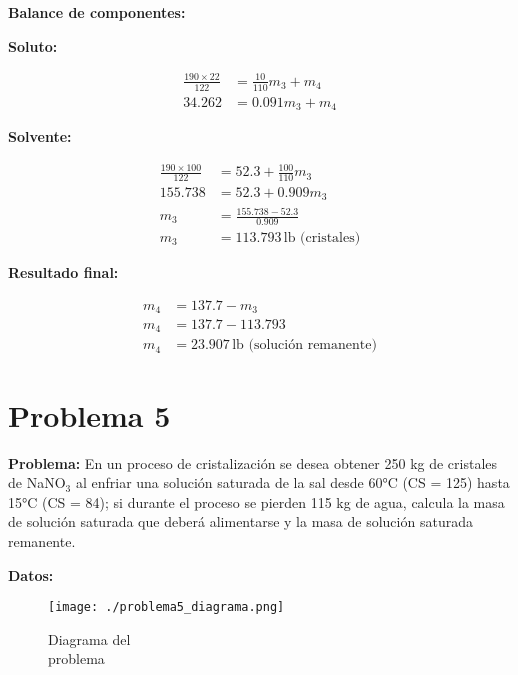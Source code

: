\documentclass{article} %
\begin{document}
\textbf{Balance de componentes:}

\textbf{Soluto:}

\begin{align*}
    \frac{190 \times 22}{122} &= \frac{10}{110}m_3 + m_4 \\[10pt]
    34.262 &= 0.091 m_3 + m_4
\end{align*}

\textbf{Solvente:}

\begin{align*}
    \frac{190 \times 100}{122} &= 52.3 + \frac{100}{110} m_3 \\[10pt]
    155.738 &= 52.3 + 0.909 m_3 \\[10pt]
    m_3 &= \frac{155.738 - 52.3}{0.909} \\[10pt]
    m_3 &= 113.793 \, \text{lb (cristales)}
\end{align*}

\textbf{Resultado final:}

\begin{align*}
    m_4 &= 137.7 - m_3 \\[10pt]
    m_4 &= 137.7 - 113.793 \\[10pt]
    m_4 &= 23.907 \, \text{lb (solución remanente)}
\end{align*}


\newpage %
\section*{Problema 5} %
\textbf{Problema:} En un proceso de cristalización se desea obtener 250 kg de cristales de NaNO$_3$ al enfriar una solución saturada de la sal desde 60°C (CS = 125) hasta 15°C (CS = 84); si durante el proceso se pierden 115 kg de agua, calcula la masa de solución saturada que deberá alimentarse y la masa de solución saturada remanente.

\noindent\textbf{Datos:} %

\begin{figure}[H]
    \begin{minipage}[t]{0.3\textwidth} %
        \raggedright %
        \texttt{[image: ./problema5\_diagrama.png]} %
        \caption{Diagrama del \\ problema}
    \end{minipage}
\end{figure}
\end{document}
